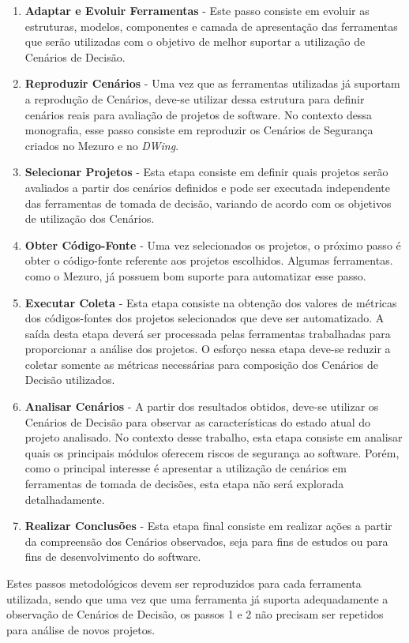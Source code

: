 \begin{enumerate}
\item \textbf{Adaptar e Evoluir Ferramentas} - Este passo consiste em evoluir as estruturas, modelos, componentes e camada de apresentação das ferramentas que serão utilizadas com o objetivo de melhor suportar a utilização de Cenários de Decisão.
\item \textbf{Reproduzir Cenários} - Uma vez que as ferramentas utilizadas já suportam a reprodução de Cenários, deve-se utilizar dessa estrutura para definir cenários reais para avaliação de projetos de software. No contexto dessa monografia, esse passo consiste em reproduzir os Cenários de Segurança criados no Mezuro e no \emph{DWing}.
\item \textbf{Selecionar Projetos} - Esta etapa consiste em definir quais projetos serão avaliados a partir dos cenários definidos e pode ser executada independente das ferramentas de tomada de decisão, variando de acordo com os objetivos de utilização dos Cenários.
\item \textbf{Obter Código-Fonte} - Uma vez selecionados os projetos, o próximo passo é obter o código-fonte referente aos projetos escolhidos. Algumas ferramentas. como o Mezuro, já possuem bom suporte para automatizar esse passo.
\item \textbf{Executar Coleta} - Esta etapa consiste na obtenção dos valores de métricas dos códigos-fontes dos projetos selecionados que deve ser automatizado. A saída desta etapa deverá ser processada pelas ferramentas trabalhadas para proporcionar a análise dos projetos. O esforço nessa etapa deve-se reduzir a coletar somente as métricas necessárias para composição dos Cenários de Decisão utilizados.
\item \textbf{Analisar Cenários} - A partir dos resultados obtidos, deve-se utilizar os Cenários de Decisão para observar as características do estado atual do projeto analisado. No contexto desse trabalho, esta etapa consiste em analisar quais os principais módulos oferecem riscos de segurança ao software. Porém, como o principal interesse é apresentar a utilização de cenários em ferramentas de tomada de decisões, esta etapa não será explorada detalhadamente.
\item \textbf{Realizar Conclusões} - Esta etapa final consiste em realizar ações a partir da compreensão dos Cenários observados, seja para fins de estudos ou para fins de desenvolvimento do software. 
\end{enumerate}


Estes passos metodológicos devem ser reproduzidos para cada ferramenta utilizada, sendo que uma vez que uma ferramenta já suporta adequadamente a observação de Cenários de Decisão, os passos 1 e 2 não precisam ser repetidos para análise de novos projetos.


